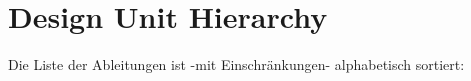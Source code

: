 \section{Design Unit Hierarchy}
Die Liste der Ableitungen ist -\/mit Einschränkungen-\/ alphabetisch sortiert\+:\begin{DoxyCompactList}
\item {}
\begin{DoxyCompactList}
\item {}
\end{DoxyCompactList}
\end{DoxyCompactList}
